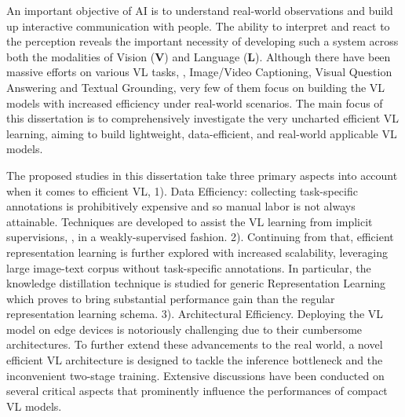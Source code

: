 An important objective of AI is to understand real-world observations and build up interactive communication with people.
The ability to interpret and react to the perception reveals the important necessity of developing such a system across both the modalities of Vision (\textbf{V}) and Language (\textbf{L}). Although there have been massive efforts on various VL tasks, \eg, Image/Video Captioning, Visual Question Answering and Textual Grounding, very few of them focus on building the VL models with increased efficiency under real-world scenarios. The main focus of this dissertation is to comprehensively investigate the very uncharted efficient VL learning, aiming to build lightweight, data-efficient, and real-world applicable VL models.

The proposed studies in this dissertation take three primary aspects into account when it comes to efficient VL,
1). {Data Efficiency}: collecting task-specific annotations is prohibitively expensive and so manual labor is not always attainable. Techniques are developed to assist the VL learning from implicit supervisions, \ie, in a weakly-supervised fashion. 2). Continuing from that, efficient representation learning is further explored with increased scalability, leveraging large image-text corpus without task-specific annotations. In particular, the knowledge distillation technique is studied for generic {Representation Learning} which proves to bring substantial performance gain than the regular representation learning schema.
3). {Architectural Efficiency}. Deploying the VL model on edge devices is notoriously challenging due to their cumbersome architectures. To further extend these advancements to the real world, a novel efficient VL architecture is designed to tackle the inference bottleneck and the inconvenient two-stage training. Extensive discussions have been conducted on several critical aspects that prominently influence the performances of compact VL models. 



